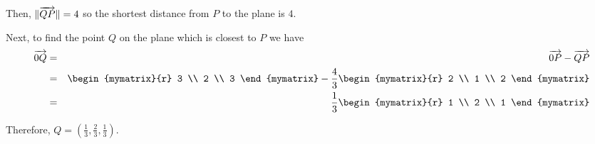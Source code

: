 \begin{solution}
Then, $\| \overrightarrow{QP} \| = 4$ so the shortest distance from $P$ to the plane is $4$. 

Next, to find the point $Q$ on the plane which is closest to $P$ we have
\begin{eqnarray*}
\longvect{0Q} &=& \longvect{0P} - \longvect{QP} \\
&=& \begin{mymatrix}{r}
3 \\
2 \\
3
\end{mymatrix} 
-
\frac{4}{3} \begin{mymatrix}{r}
2 \\
1 \\
2
\end{mymatrix} \\
&=& 
\frac{1}{3}
\begin{mymatrix}{r}
1 \\
2 \\
1
\end{mymatrix}
\end{eqnarray*}

Therefore, $Q = (\frac{1}{3}, \frac{2}{3}, \frac{1}{3} )$.  
\end{solution}
